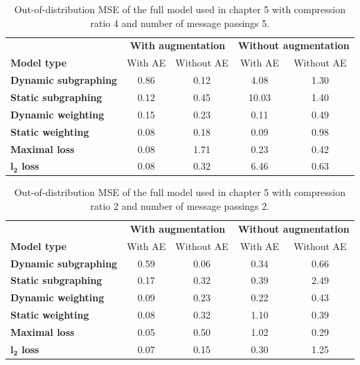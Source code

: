 \documentclass[12pt,a4paper]{report}
\begin{document}
\begin{appendices}
\begin{table}
\centering
\caption{Out-of-distribution MSE of the full model used in chapter 5 with compression ratio 4 and number of message passings 5.}
\label{table_4_5}
\begin{tabular}{lcccc}
\toprule
 & \multicolumn{2}{c}{\textbf{With augmentation}} & \multicolumn{2}{c}{\textbf{Without augmentation}} \\
 \cmidrule{2-3} \cmidrule{4-5}
\textbf{Model type} & With AE & Without AE & With AE & Without AE \\
\midrule
\textbf{Dynamic subgraphing} & 0.86 & 0.12 & 4.08 & 1.30 \\
\textbf{Static subgraphing} & 0.12 & 0.45 & 10.03 & 1.40 \\
\textbf{Dynamic weighting} & 0.15 & 0.23 & 0.11 & 0.49 \\
\textbf{Static weighting} & 0.08 & 0.18 & 0.09 & 0.98 \\
\textbf{Maximal loss} & 0.08 & 1.71 & 0.23 & 0.42 \\
\textbf{$\boldsymbol{l_2}$ loss} & 0.08 & 0.32 & 6.46 & 0.63 \\
\bottomrule
\end{tabular}
\end{table}

\begin{table}
\centering
\caption{Out-of-distribution MSE of the full model used in chapter 5 with compression ratio 2 and number of message passings 2.}
\label{table_2_2}
\begin{tabular}{lcccc}
\toprule
 & \multicolumn{2}{c}{\textbf{With augmentation}} & \multicolumn{2}{c}{\textbf{Without augmentation}} \\
 \cmidrule{2-3} \cmidrule{4-5}
\textbf{Model type} & With AE & Without AE & With AE & Without AE \\
\midrule
\textbf{Dynamic subgraphing} & 0.59 & 0.06 & 0.34 & 0.66 \\
\textbf{Static subgraphing} & 0.17 & 0.32 & 0.39 & 2.49 \\
\textbf{Dynamic weighting} & 0.09 & 0.23 & 0.22 & 0.43 \\
\textbf{Static weighting} & 0.08 & 0.32 & 1.10 & 0.39 \\
\textbf{Maximal loss} & 0.05 & 0.50 & 1.02 & 0.29 \\
\textbf{$\boldsymbol{l_2}$ loss} & 0.07 & 0.15 & 0.30 & 1.25 \\
\bottomrule
\end{tabular}
\end{table}


\end{appendices}
\end{document}
